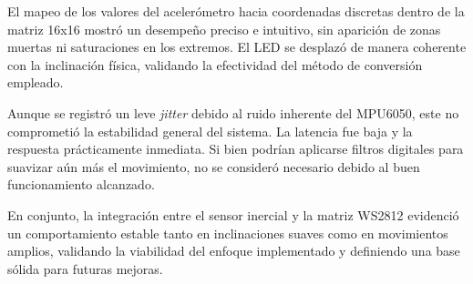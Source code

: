 El mapeo de los valores del acelerómetro hacia coordenadas discretas dentro de la matriz 16x16 mostró un desempeño preciso e intuitivo, sin aparición de zonas muertas ni saturaciones en los extremos. El LED se desplazó de manera coherente con la inclinación física, validando la efectividad del método de conversión empleado.

\vspace{1em}

Aunque se registró un leve \textit{jitter} debido al ruido inherente del MPU6050, este no comprometió la estabilidad general del sistema. La latencia fue baja y la respuesta prácticamente inmediata. Si bien podrían aplicarse filtros digitales para suavizar aún más el movimiento, no se consideró necesario debido al buen funcionamiento alcanzado.

\vspace{1em}

En conjunto, la integración entre el sensor inercial y la matriz WS2812 evidenció un comportamiento estable tanto en inclinaciones suaves como en movimientos amplios, validando la viabilidad del enfoque implementado y definiendo una base sólida para futuras mejoras.
